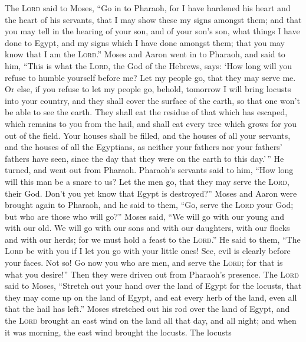  The \textsc{Lord} said to Moses, ``Go in to Pharaoh, for
I have hardened his heart and the heart of his servants, that I may show
these my signs amongst them;  and that you may tell in the
hearing of your son, and of your son's son, what things I have done to
Egypt, and my signs which I have done amongst them; that you may know
that I am the \textsc{Lord}.''  Moses and Aaron went in to
Pharaoh, and said to him, ``This is what the \textsc{Lord}, the God of
the Hebrews, says: `How long will you refuse to humble yourself before
me? Let my people go, that they may serve me.  Or else, if
you refuse to let my people go, behold, tomorrow I will bring locusts
into your country,  and they shall cover the surface of
the earth, so that one won't be able to see the earth. They shall eat
the residue of that which has escaped, which remains to you from the
hail, and shall eat every tree which grows for you out of the field.
 Your houses shall be filled, and the houses of all your
servants, and the houses of all the Egyptians, as neither your fathers
nor your fathers' fathers have seen, since the day that they were on the
earth to this day.'\,'' He turned, and went out from Pharaoh.
 Pharaoh's servants said to him, ``How long will this man
be a snare to us? Let the men go, that they may serve the \textsc{Lord},
their God. Don't you yet know that Egypt is destroyed?'' 
Moses and Aaron were brought again to Pharaoh, and he said to them,
``Go, serve the \textsc{Lord} your God; but who are those who will go?''
 Moses said, ``We will go with our young and with our old.
We will go with our sons and with our daughters, with our flocks and
with our herds; for we must hold a feast to the \textsc{Lord}.''
 He said to them, ``The \textsc{Lord} be with you if I
let you go with your little ones! See, evil is clearly before your
faces.  Not so! Go now you who are men, and serve the
\textsc{Lord}; for that is what you desire!'' Then they were driven out
from Pharaoh's presence.  The \textsc{Lord} said to
Moses, ``Stretch out your hand over the land of Egypt for the locusts,
that they may come up on the land of Egypt, and eat every herb of the
land, even all that the hail has left.''  Moses stretched
out his rod over the land of Egypt, and the \textsc{Lord} brought an
east wind on the land all that day, and all night; and when it was
morning, the east wind brought the locusts.  The locusts
